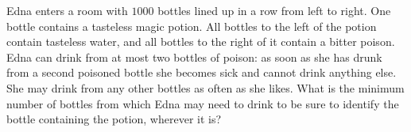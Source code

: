 Edna enters a room with $1000$ bottles lined up in a row from left to right. One bottle contains a tasteless magic potion. All bottles to the left of the potion contain tasteless water, and all bottles to the right of it contain a bitter poison. Edna can drink from at most two bottles of poison: as soon as she has drunk from a second poisoned bottle she becomes sick and cannot drink anything else. She may drink from any other bottles as often as she likes. What is the minimum number of bottles from which Edna may need to drink to be sure to identify the bottle containing the potion, wherever it is?
